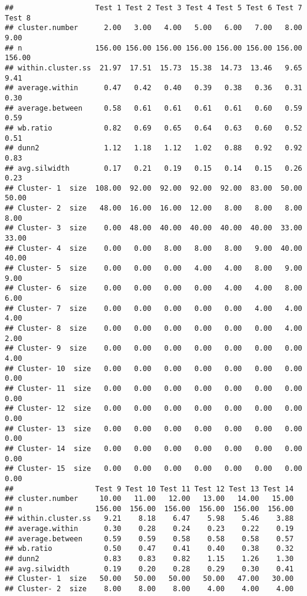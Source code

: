 \documentclass[
]{article}
\begin{document}
\begin{verbatim}
##                   Test 1 Test 2 Test 3 Test 4 Test 5 Test 6 Test 7 Test 8
## cluster.number      2.00   3.00   4.00   5.00   6.00   7.00   8.00   9.00
## n                 156.00 156.00 156.00 156.00 156.00 156.00 156.00 156.00
## within.cluster.ss  21.97  17.51  15.73  15.38  14.73  13.46   9.65   9.41
## average.within      0.47   0.42   0.40   0.39   0.38   0.36   0.31   0.30
## average.between     0.58   0.61   0.61   0.61   0.61   0.60   0.59   0.59
## wb.ratio            0.82   0.69   0.65   0.64   0.63   0.60   0.52   0.51
## dunn2               1.12   1.18   1.12   1.02   0.88   0.92   0.92   0.83
## avg.silwidth        0.17   0.21   0.19   0.15   0.14   0.15   0.26   0.23
## Cluster- 1  size  108.00  92.00  92.00  92.00  92.00  83.00  50.00  50.00
## Cluster- 2  size   48.00  16.00  16.00  12.00   8.00   8.00   8.00   8.00
## Cluster- 3  size    0.00  48.00  40.00  40.00  40.00  40.00  33.00  33.00
## Cluster- 4  size    0.00   0.00   8.00   8.00   8.00   9.00  40.00  40.00
## Cluster- 5  size    0.00   0.00   0.00   4.00   4.00   8.00   9.00   9.00
## Cluster- 6  size    0.00   0.00   0.00   0.00   4.00   4.00   8.00   6.00
## Cluster- 7  size    0.00   0.00   0.00   0.00   0.00   4.00   4.00   4.00
## Cluster- 8  size    0.00   0.00   0.00   0.00   0.00   0.00   4.00   2.00
## Cluster- 9  size    0.00   0.00   0.00   0.00   0.00   0.00   0.00   4.00
## Cluster- 10  size   0.00   0.00   0.00   0.00   0.00   0.00   0.00   0.00
## Cluster- 11  size   0.00   0.00   0.00   0.00   0.00   0.00   0.00   0.00
## Cluster- 12  size   0.00   0.00   0.00   0.00   0.00   0.00   0.00   0.00
## Cluster- 13  size   0.00   0.00   0.00   0.00   0.00   0.00   0.00   0.00
## Cluster- 14  size   0.00   0.00   0.00   0.00   0.00   0.00   0.00   0.00
## Cluster- 15  size   0.00   0.00   0.00   0.00   0.00   0.00   0.00   0.00
##                   Test 9 Test 10 Test 11 Test 12 Test 13 Test 14
## cluster.number     10.00   11.00   12.00   13.00   14.00   15.00
## n                 156.00  156.00  156.00  156.00  156.00  156.00
## within.cluster.ss   9.21    8.18    6.47    5.98    5.46    3.88
## average.within      0.30    0.28    0.24    0.23    0.22    0.19
## average.between     0.59    0.59    0.58    0.58    0.58    0.57
## wb.ratio            0.50    0.47    0.41    0.40    0.38    0.32
## dunn2               0.83    0.83    0.82    1.15    1.26    1.30
## avg.silwidth        0.19    0.20    0.28    0.29    0.30    0.41
## Cluster- 1  size   50.00   50.00   50.00   50.00   47.00   30.00
## Cluster- 2  size    8.00    8.00    8.00    4.00    4.00    4.00

\end{verbatim}
\end{document}
